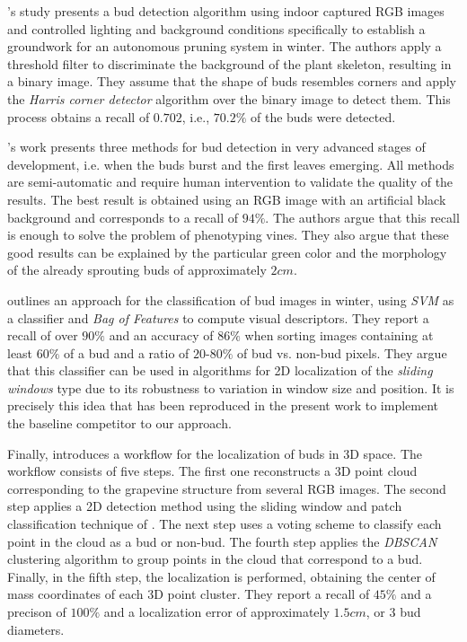 \documentclass[a4paper,authoryear,review]{elsarticle}
\begin{document}
	\citet{xu2014detection}’s study presents a bud detection algorithm using indoor captured RGB images and controlled lighting and background conditions specifically to establish a groundwork for an autonomous pruning system in winter. The authors apply a threshold filter to discriminate the background of the plant skeleton, resulting in a binary image. They assume that the shape of buds resembles corners and apply the \emph{Harris corner detector} algorithm over the binary image to detect them. This process obtains a recall of $0.702$, i.e., $70.2\%$ of the buds were detected. 
	
	\citet{herzog2014initial}’s work presents three methods for bud detection in very advanced stages of development, i.e. when the buds burst and the first leaves emerging. All methods are semi-automatic and require human intervention to validate the quality of the results. The best result is obtained using an RGB image with an artificial black background and corresponds to a recall of $94\%$. The authors argue that this recall is enough to solve the problem of phenotyping vines. They also argue that these good results can be explained by the particular green color and the morphology of the already sprouting buds of approximately $2cm$.  
	
	\citet{perez2017image} outlines an approach for the classification of bud images in winter, using \emph{SVM} as a classifier and \emph{Bag of Features} to compute visual descriptors. They report a recall of over $90\%$ and an accuracy of $86\%$ when sorting images containing at least $60\%$ of a bud and a ratio of $20$-$80\%$ of bud vs. non-bud pixels. They argue that this classifier can be used in algorithms for 2D localization of the \emph{sliding windows} type due to its robustness to variation in window size and position. It is precisely this idea that has been reproduced in the present work to implement the baseline competitor to our approach.
	
	Finally, \citet{diaz2018grapevine} introduces a workflow for the localization of buds in 3D space. The workflow consists of five steps. The first one reconstructs a 3D point cloud corresponding to the grapevine structure from several RGB images. The second step applies a 2D detection method using the sliding window and patch classification technique of \citet{perez2017image}. The next step uses a voting scheme to classify each point in the cloud as a bud or non-bud. The fourth step applies the \emph{DBSCAN} clustering algorithm to group points in the cloud that correspond to a bud. Finally, in the fifth step, the localization is performed, obtaining the center of mass coordinates of each 3D point cluster. They report a recall of $45\%$ and a precison of $100\%$ and a localization error of approximately $1.5cm$, or 3 bud diameters.  
	
\end{document}
